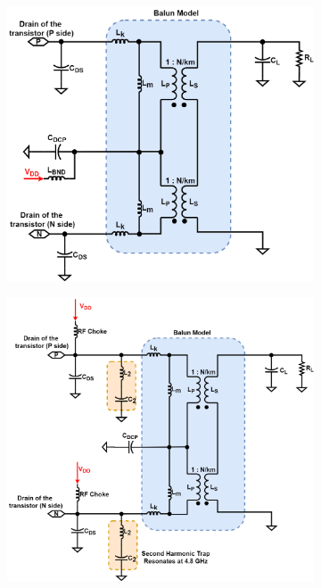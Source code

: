 \documentclass[conference]{IEEEtran}
\begin{document}
\begin{figure}[!t]
\captionsetup{font=footnotesize}
\centering
\begin{subfigure}{0.24\textwidth}
\includegraphics[width=1\textwidth]{Images/Design/Design_B_FC.png}
\caption{}
\label{fig:Design_B_FC}
\end{subfigure}
\begin{subfigure}{0.24\textwidth}
\includegraphics[width=1\textwidth]{Images/Design/Design_C_FC.png}

\end{subfigure}
\end{figure}
\end{document}
